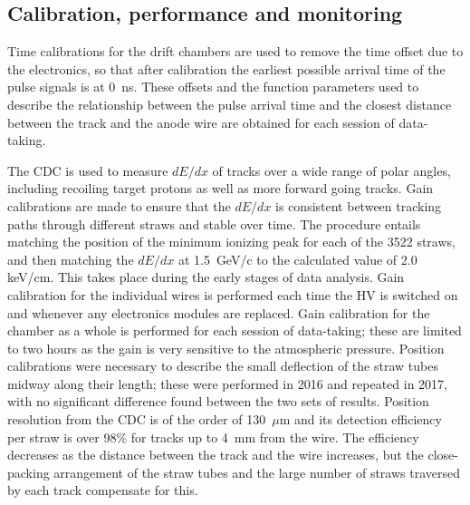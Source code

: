 \subsection{Calibration, performance and monitoring \label{sec:dccalib}}
Time calibrations for the drift chambers are used to remove the time offset due to the electronics, so that after calibration the earliest possible arrival time of the pulse signals is at 0~ns. These offsets and the function parameters used to describe the relationship between the pulse arrival time and the closest distance between the track and the anode wire are obtained for each session of data-taking. 

The CDC is used to measure $dE/dx$ of tracks over a wide range of polar angles, including recoiling target protons as well as more forward going tracks. Gain calibrations are made to ensure that the $dE/dx$ is consistent between tracking paths through different straws and stable over time. 
The procedure entails matching the position of the minimum ionizing peak for each of the 3522 straws, and then matching the $dE/dx$ at 1.5~GeV/c to the calculated value of 2.0~ keV/cm. This takes place during the early stages of data analysis. Gain calibration for the individual wires is performed each time the HV is switched on and whenever any electronics modules are replaced. Gain calibration for the chamber as a whole is performed for each session of data-taking; these are limited to two hours as the gain is very sensitive to the atmospheric pressure. Position calibrations were necessary to describe the small deflection of the straw tubes midway along their length; these were performed in 2016 and repeated in 2017, with no significant difference found between the two sets of results.  Position resolution from the CDC is of the order of 130~$\mu$m and its detection efficiency per straw is over 98\% for tracks up to 4~mm from the wire. The efficiency decreases as the distance between the track and the wire increases, but the close-packing arrangement of the straw tubes and the large number of straws traversed by each track compensate for this. 

